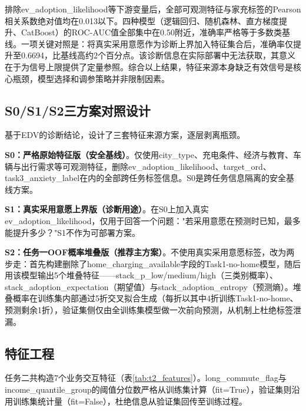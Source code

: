排除ev\_adoption\_likelihood等下游变量后，全部可观测特征与家充标签的Pearson相关系数绝对值均在0.013以下。四种模型（逻辑回归、随机森林、直方梯度提升、CatBoost）的ROC-AUC值全部集中在0.50附近，准确率严格等于多数类基线。一项关键对照是：将真实采用意愿作为诊断上界加入特征集合后，准确率仅提升至0.6694，比基线高约2个百分点。该诊断信息在实际部署中无法获取，其意义在于为信号上限提供了定量参照。综合以上结果，特征来源本身缺乏有效信号是核心瓶颈，模型选择和调参策略并非限制因素。

\subsection{S0/S1/S2三方案对照设计}

基于EDV的诊断结论，设计了三套特征来源方案，逐层剥离瓶颈。

\textbf{S0：严格原始特征版（安全基线）}。仅使用city\_type、充电条件、经济与教育、车辆与出行需求等可观测特征，删除ev\_adoption\_likelihood、target\_ord、task3\_anxiety\_label在内的全部跨任务标签信息。S0是跨任务信息隔离的安全基线方案。

\textbf{S1：真实采用意愿上界版（诊断用途）}。在S0上加入真实ev\_adoption\_likelihood，仅用于回答一个问题："若采用意愿在预测时已知，最多能提升多少？"S1不作为可部署方案。

\textbf{S2：任务一OOF概率堆叠版（推荐主方案）}。不使用真实采用意愿标签，改为两步走：首先构建删除了home\_charging\_available字段的Task1-no-home模型，随后用该模型输出5个堆叠特征——stack\_p\_low/medium/high（三类别概率）、stack\_adoption\_expectation（期望值）与stack\_adoption\_entropy（预测熵）。堆叠概率在训练集内部通过5折交叉拟合生成（每折以其中4折训练Task1-no-home、预测剩余1折），验证集侧仅由全训练集模型做一次前向预测，从机制上杜绝标签泄漏。

\subsection{特征工程}

任务二共构造7个业务交互特征（表\ref{tab:t2_features}）。long\_commute\_flag与income\_quantile\_group的阈值分位数严格从训练集计算（fit=True），验证集则沿用训练集统计量（fit=False），杜绝信息从验证集回传至训练过程。

